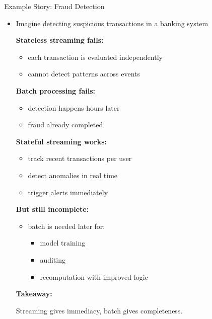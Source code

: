 \documentclass[aspectratio=169]{beamer}
\begin{document}
\begin{frame}{Example Story: Fraud Detection}
\begin{itemize}
    \item Imagine detecting suspicious transactions in a banking system

    \vspace{0.2cm}
    \textbf{Stateless streaming fails:}
    \begin{itemize}
        \item each transaction is evaluated independently
        \item cannot detect patterns across events
    \end{itemize}

    \vspace{0.2cm}
    \textbf{Batch processing fails:}
    \begin{itemize}
        \item detection happens hours later
        \item fraud already completed
    \end{itemize}

    \vspace{0.2cm}
    \textbf{Stateful streaming works:}
    \begin{itemize}
        \item track recent transactions per user
        \item detect anomalies in real time
        \item trigger alerts immediately
    \end{itemize}

    \vspace{0.3cm}
    \textbf{But still incomplete:}
    \begin{itemize}
        \item batch is needed later for:
        \begin{itemize}
            \item model training
            \item auditing
            \item recomputation with improved logic
        \end{itemize}
    \end{itemize}

    \vspace{0.3cm}
    \textbf{Takeaway:}
    \begin{block}{}
    Streaming gives immediacy, batch gives completeness.
    \end{block}
\end{itemize}
\end{frame}
\end{document}
